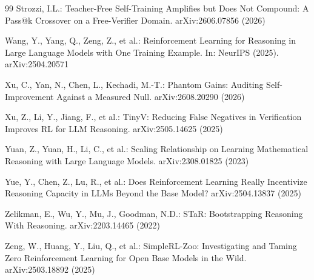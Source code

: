 \documentclass[runningheads]{llncs}
\begin{document}
\begin{thebibliography}{99}
Strozzi, I.L.: Teacher-Free Self-Training Amplifies but Does Not Compound:
A Pass@k Crossover on a Free-Verifier Domain. arXiv:2606.07856 (2026)

Wang, Y., Yang, Q., Zeng, Z., et al.: Reinforcement
Learning for Reasoning in Large Language Models with One Training Example.
In: NeurIPS (2025). arXiv:2504.20571

Xu, C., Yan, N., Chen, L., Kechadi, M.-T.: Phantom Gains: Auditing
Self-Improvement Against a Measured Null. arXiv:2608.20290 (2026)

Xu, Z., Li, Y., Jiang, F., et al.: TinyV: Reducing False Negatives in Verification Improves RL
for LLM Reasoning. arXiv:2505.14625 (2025)

Yuan, Z., Yuan, H., Li, C., et al.:
Scaling Relationship on Learning Mathematical Reasoning with Large Language
Models. arXiv:2308.01825 (2023)

Yue, Y., Chen, Z., Lu, R., et al.: Does Reinforcement Learning Really Incentivize Reasoning Capacity in
LLMs Beyond the Base Model? arXiv:2504.13837 (2025)

Zelikman, E., Wu, Y., Mu, J., Goodman, N.D.: STaR: Bootstrapping Reasoning
With Reasoning. arXiv:2203.14465 (2022)

Zeng, W., Huang, Y., Liu, Q., et al.: SimpleRL-Zoo:
Investigating and Taming Zero Reinforcement Learning for Open Base Models in
the Wild. arXiv:2503.18892 (2025)

\end{thebibliography}
\end{document}
